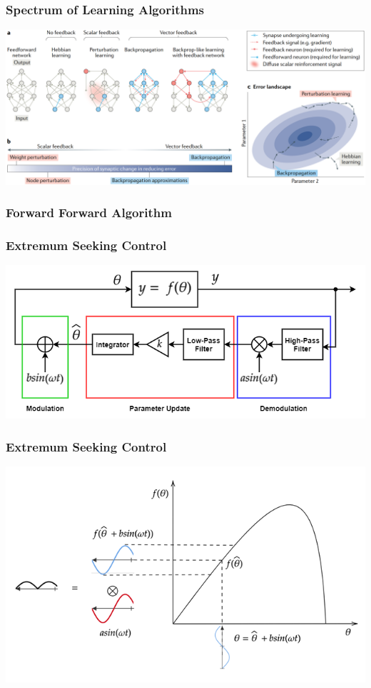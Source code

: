 \documentclass[
	11pt, %
]{beamer}
\begin{document}

\begin{frame}
  \frametitle{Spectrum of Learning Algorithms}
  \includegraphics[width=\columnwidth]{../report/images/grad_landscape.png}
\end{frame}


\begin{frame}
	\frametitle{Forward Forward Algorithm}	
\end{frame}


\begin{frame}
  \frametitle{Extremum Seeking Control}
   \includegraphics[width=0.9\columnwidth]{../report/images/esc_static_optimization.png}
\end{frame}



\begin{frame}
  \frametitle{Extremum Seeking Control}
  \includegraphics[width=0.9\columnwidth]{../report/images/esc_increasing_objective.png}
\end{frame}
\end{document}
